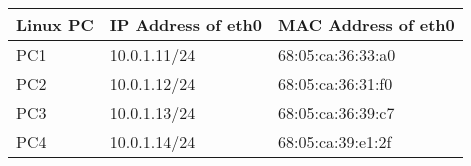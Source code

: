 \begin{tabular}{ | l | l | l |}
\hline
Linux PC & IP Address of eth0 & MAC Address of eth0 \\ \hline
PC1 & 10.0.1.11/24 & 68:05:ca:36:33:a0 \\ \hline
PC2 & 10.0.1.12/24 & 68:05:ca:36:31:f0 \\ \hline
PC3 & 10.0.1.13/24 & 68:05:ca:36:39:c7 \\ \hline
PC4 & 10.0.1.14/24 & 68:05:ca:39:e1:2f \\ \hline
\end{tabular}